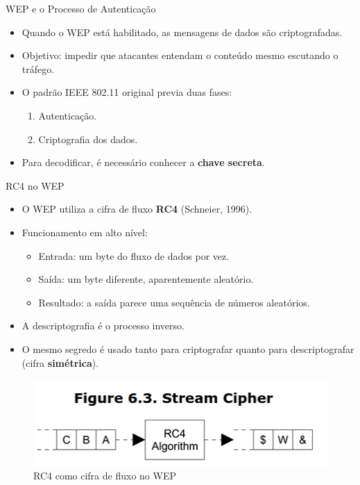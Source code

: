 \begin{frame}{WEP e o Processo de Autenticação}
\begin{itemize}
    \item Quando o WEP está habilitado, as mensagens de dados são criptografadas.  
    \item Objetivo: impedir que atacantes entendam o conteúdo mesmo escutando o tráfego.  
    \item O padrão IEEE 802.11 original previa duas fases:  
    \begin{enumerate}
        \item Autenticação.  
        \item Criptografia dos dados.  
    \end{enumerate}
    \item Para decodificar, é necessário conhecer a \textbf{chave secreta}.  
\end{itemize}
\end{frame}

\begin{frame}{RC4 no WEP}
\begin{itemize}
    \item O WEP utiliza a cifra de fluxo \textbf{RC4} (Schneier, 1996).  
    \item Funcionamento em alto nível:  
    \begin{itemize}
        \item Entrada: um byte do fluxo de dados por vez.  
        \item Saída: um byte diferente, aparentemente aleatório.  
        \item Resultado: a saída parece uma sequência de números aleatórios.  
    \end{itemize}
    \item A descriptografia é o processo inverso.  
    \item O mesmo segredo é usado tanto para criptografar quanto para descriptografar (cifra \textbf{simétrica}).  
\end{itemize}

\begin{figure}
    \centering
    \includegraphics[width=0.55\linewidth]{Figuras/rc4-wep-stream.png}
    \caption{RC4 como cifra de fluxo no WEP}
\end{figure}
\end{frame}


